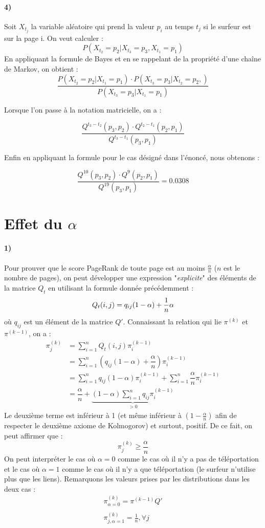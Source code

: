 \documentclass[a4paper,titlepage]{report}
\begin{document}
\paragraph{4)}
Soit $ X_{t_j}$ la variable aléatoire qui prend la valeur $p_i$ au temps $t_j$ si le surfeur est sur la page i.
On veut calculer : $$
P(X_{t_2} = p_2 | X_{t_3} = p_3 , X_{t_1} = p_1)
$$
En appliquant la formule de Bayes et en se rappelant de la propriété d'une chaîne de Markov, on obtient :
$$ \dfrac{P(X_{t_2} = p_2 | X_{t_1} = p_1) \cdot P(X_{t_3} = p_3 | X_{t_2} = p_2,)}{P(X_{t_3} = p_3 | X_{t_1} = p_1)} $$

Lorsque l'on passe à la notation matricielle, on a :

$$\dfrac{Q^{t_3 - t_2}(p_3, p_2) \cdot Q^{t_2 - t_1}(p_2, p_1)}{Q^{t_3 - t_1}(p_3, p_1)}
$$

Enfin en appliquant la formule pour le cas désigné dans l'énoncé, nous obtenons :

$$\dfrac{Q^{10}(p_3, p_2) \cdot Q^{9}(p_2, p_1)}{Q^{19}(p_3, p_1)} = 0.0308
$$

\section{Effet du $\alpha$}
\label{sec:effet_alpha}
\paragraph{1)}
Pour prouver que le score PageRank de toute page est au moins $\frac{\alpha}{n}$ ($n$ est le nombre de pages), on peut développer une expression "\textit{explicite}" des éléments de la matrice $Q_t$ en utilisant la formule donnée précédemment : 
\[
Q_t(i,j) = q_{ij} (1 - \alpha) + \dfrac{1}{n}\alpha\\
\]
où $q_{ij}$ est un élément de la matrice $Q'$. Connaissant la relation qui lie $\pi^{(k)}$ et $\pi^{(k-1)}$, on a :
\[
\begin{aligned}
\pi^{(k)}_j &= \sum\limits_{i = 1}^n Q_t(i,j)\pi^{(k-1)}_i\\
 &= \sum\limits_{i = 1}^n \left(q_{ij} (1 - \alpha) + \dfrac{\alpha}{n}\right)\pi^{(k-1)}_i\\
 &= \sum\limits_{i = 1}^n q_{ij} (1 - \alpha) \pi^{(k-1)}_i + \sum\limits_{i = 1}^n \dfrac{\alpha}{n} \pi^{(k-1)}_i\\
 &= \dfrac{\alpha}{n} + \underbrace{(1 - \alpha) \sum\limits_{i = 1}^n q_{ij} \pi^{(k-1)}_i}_{> 0}
\end{aligned}
\]
Le deuxième terme est inférieur à 1 (et même inférieur à $(1 - \frac{\alpha}{n})$ afin de respecter le deuxième axiome de Kolmogorov) et surtout, positif. De ce fait, on peut affirmer que :
\[
\pi^{(k)}_j \geq \dfrac{\alpha}{n}
\]
On peut interpréter le cas où $\alpha = 0$ comme le cas où il n'y a pas de téléportation et le cas où $\alpha = 1$ comme le cas où il n'y a que téléportation (le surfeur n'utilise plus que les liens). Remarquons les valeurs prises par les distributions dans les deux cas :
\[
\begin{array}{l}
\pi_{\alpha = 0}^{(k)} = \pi^{(k-1)} Q'\\ \\
\pi_{j,\alpha = 1}^{(k)} = \frac{1}{n}, \forall j
\end{array}
\]
\end{document}
